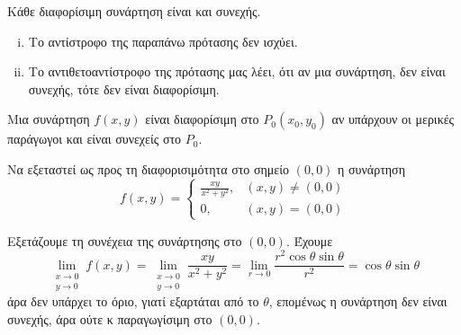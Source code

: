 \documentclass[a4paper,table]{report}
\begin{document}
\begin{prop}
  Κάθε διαφορίσιμη συνάρτηση είναι και συνεχής.
\end{prop}

\begin{rem}
\item {}
  \begin{enumerate}[i)]
    \item Το αντίστροφο της παραπάνω πρότασης δεν ισχύει.
    \item Το αντιθετοαντίστροφο της πρότασης μας λέει, ότι αν μια συνάρτηση, 
      δεν είναι συνεχής, τότε δεν είναι διαφορίσιμη.
  \end{enumerate}
\end{rem}

\begin{thm}
\item {}
  Μια συνάρτηση $ f(x,y) $ είναι διαφορίσιμη στο $ P_{0}(x_{0}, y_{0}) $ 
  αν υπάρχουν οι μερικές παράγωγοι και είναι συνεχείς στο $ P_{0} $.
\end{thm}

\begin{example}
  Να εξεταστεί ως προς τη διαφορισιμότητα στο σημείο $(0,0)$ 
  η συνάρτηση 
  \[ 
    f(x,y) = 
    \begin{cases} 
      \frac{xy}{x^{2}+y^{2}}, &(x,y) \neq (0,0) \\ 0, & (x,y) = (0,0) 
    \end{cases} 
  \]
\end{example}
\begin{solution}
\item {}
  Εξετάζουμε τη συνέχεια της συνάρτησης στο $ (0,0) $. Έχουμε
  \[ \lim\limits_{\substack{x\to 0 \\y \to 0}} f(x,y) =
    \lim\limits_{\substack{x\to 0 \\y \to 0}} \frac{xy}{x^{2}+y^{2}} =
    \lim_{r \to 0} \frac{r^{2} \cos{\theta} \sin{\theta}}{r^{2}} =
  \cos{\theta} \sin{\theta} \] άρα δεν υπάρχει το όριο, γιατί εξαρτάται από το 
  $\theta$, επομένως η συνάρτηση δεν είναι συνεχής, άρα ούτε κ παραγωγίσιμη στο 
  $ (0,0) $.
\end{solution}
\end{document}
